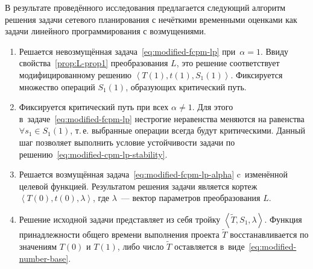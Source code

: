 В результате проведённого исследования предлагается следующий алгоритм решения задачи сетевого планирования с нечёткими временными оценками как задачи линейного программирования с возмущениями.
\begin{enumerate}
  \item Решается невозмущённая задача~\eqref{eq:modified-fcpm-lp} при~$\alpha=1$. Ввиду свойства~\ref{prop:L-prop1} преобразования $L$, это решение соответствует модифицированному решению $\left \langle T\left(1\right), t\left(1\right), S_1\left(1\right) \right \rangle$. Фиксируется множество операций $S_1\left(1\right)$, образующих критический путь.
  \item Фиксируется критический путь при всех $\alpha \neq 1$. Для этого в~задаче~\eqref{eq:modified-fcpm-lp} нестрогие неравенства меняются на равенства $\forall s_1 \in S_1\left(1\right)$, т.\,е. выбранные операции всегда будут критическими. Данный шаг позволяет выполнить условие устойчивости задачи по решению~\eqref{eq:modified-cpm-lp-stability}.
  \item Решается возмущённая задача~\eqref{eq:modified-fcpm-lp-alpha} c~изменённой целевой функцией. Результатом решения задачи является кортеж $\left \langle T\left(0\right), t\left(0\right), \lambda \right \rangle$, где $\lambda$~--- вектор параметров преобразования $L$.
  \item Решение исходной задачи представляет из себя тройку $\left \langle \tilde T, S_1, \lambda \right \rangle$. Функция принадлежности общего времени выполнения проекта $\tilde T$ восстанавливается по значениям $T\left(0\right)$ и $T\left(1\right)$, либо число $\tilde T$ оставляется в~виде~\eqref{eq:modified-number-base}.
\end{enumerate}


